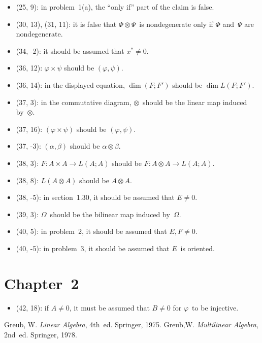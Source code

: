 \documentclass[letterpaper,12pt]{article}
\newcommand{\tprod}{\otimes}
\begin{document}
\begin{itemize}
\item (25, 9): in problem~1(a), the ``only if'' part of the claim is false.
\item (30, 13), (31, 11): it is false that \(\Phi\tprod\Psi\)~is nondegenerate only if \(\Phi\) and~\(\Psi\) are nondegenerate.
\item (34, -2): it should be assumed that \(x^*\ne 0\).
\item (36, 12): \(\varphi\times\psi\) should be \((\varphi,\psi)\).
\item (36, 14): in the displayed equation, \(\dim(F;F')\) should be \(\dim L(F;F')\).
\item (37, 3): in the commutative diagram, \(\tprod\)~should be the linear map induced by~\(\tprod\).
\item (37, 16): \((\varphi\times\psi)\) should be \((\varphi,\psi)\).
\item (37, -3): \((\alpha,\beta)\) should be \(\alpha\tprod\beta\).
\item (38, 3): \(F:A\times A\to L(A;A)\) should be \(F:A\tprod A\to L(A;A)\).
\item (38, 8): \(L(A\tprod A)\) should be \(A\tprod A\).
\item (38, -5): in section~1.30, it should be assumed that \(E\ne 0\).
\item (39, 3): \(\Omega\)~should be the bilinear map induced by~\(\Omega\).
\item (40, 5): in problem~2, it should be assumed that \(E,F\ne 0\).
\item (40, -5): in problem~3, it should be assumed that \(E\)~is oriented.
\end{itemize}

\section*{Chapter~2}
\begin{itemize}
\item (42, 18): if \(A\ne 0\), it must be assumed that \(B\ne 0\) for \(\varphi\)~to be injective.
\end{itemize}

\begin{thebibliography}{0}
 Greub, W. \textit{Linear Algebra}, 4th~ed. Springer, 1975.
 Greub,W. \textit{Multilinear Algebra}, 2nd~ed. Springer, 1978.
\end{thebibliography}
\end{document}
